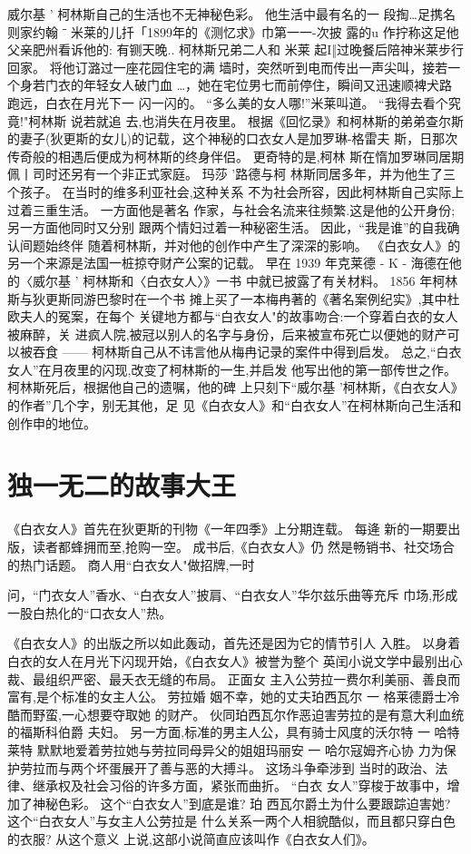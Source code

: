 \documentclass[a4paper]{article}
\begin{document}
威尔基 ' 柯林斯自己的生活也不无神秘色彩。 他生活中最有名的一
段掏…足携名则家约翰 ˉ 米莱的儿扦「1899年的《测忆求》巾第一一-次披
露的u 作拧称这足他父亲肥州看诉他的: 有铡天晚.. 柯林斯兄弟二人和
米莱 起I‖过晚餐后陪神米莱步行回家。 将他订潞过一座花园住宅的满
墙时，突然听到电而传出一声尖叫，接若一个身若门衣的年轻女人破门血
…，她在宅位男七而前停住，瞬间又迅速顺裨犬路跑远，白衣在月光下一
闪一闪的。 “多么美的女人哪!”米莱叫道。 “我得去看个究竟!"柯林斯
说若就追 去,也消失在月夜里。 根据《回忆录》和柯林斯的弟弟查尔斯
的妻子(狄更斯的女儿)的记载，这个神秘的口衣女人是加罗琳-格雷夫
斯，日那次传奇般的相遇后便成为柯林斯的终身伴侣。 更奇特的是,柯林
斯在惰加罗琳同居期佩丨司时还另有一个非正式家庭。 玛莎 '路德与柯
林斯同居多年，并为他生了三个孩子。 在当时的维多利亚社会,这种关系
不为社会所容，因此柯林斯自己实际上过着三重生活。 一方面他是著名
作家，与社会名流来往频繁.这是他的公开身份;另一方面他同时又分别
跟两个情妇过着一种秘密生活。 因此，“我是谁”的自我确认间题始终伴
随着柯林斯，并对他的创作中产生了深深的影响。
《白衣女人》的另一个来源是法国一桩掠夺财产公案的记载。 早在
1939 年克莱德 - K - 海德在他的〈威尔基 ' 柯林斯和〈白衣女人〉》一书
中就已披露了有关材料。 1856 年柯林斯与狄更斯同游巴黎时在一个书
摊上买了一本梅冉著的《著名案例纪实》,其中杜欧夫人的冤案，在每个
关键地方都与“白衣女人"的故事吻合:一个穿着白衣的女人被麻醉，关
进疯人院,被冠以别人的名字与身份，后来被宣布死亡以便她的财产可
以被吞食 ------ 柯林斯自己从不讳言他从梅冉记录的案件中得到启发。
总之,“白衣女人”在月夜里的闪现,改变了柯林斯的一生,并启发
他写出他的第一部传世之作。 柯林斯死后，根据他自己的遗嘱，他的碑
上只刻下“威尔基 '柯林斯，《白衣女人》的作者”几个字，别无其他，足
见《白衣女人》和“白衣女人”在柯林斯向己生活和创作申的地位。

\section{独一无二的故事大王}

《白衣女人》首先在狄更斯的刊物《一年四季》上分期连载。 每逄
新的一期要出版，读者都蜂拥而至,抢购一空。 成书后,《白衣女人》仍
然是畅销书、社交场合的热门话题。 商人用“白衣女人"做招牌,一时

问，“门衣女人”香水、“白衣女人”披肩、“白衣女人”华尔兹乐曲等充斥
巾场,形成一股白热化的“口衣女人”热。

《白衣女人》的出版之所以如此轰动，首先还是因为它的情节引人
入胜。 以身着白衣的女人在月光下闪现开始，《白衣女人》被誉为整个
英闰小说文学中最别出心裁、最组织严密、最夭衣无缝的布局。 正面女
主入公劳拉一费尔利美丽、善良而富有,是个标准的女主人公。 劳拉婚
姻不幸，她的丈夫珀西瓦尔 一 格莱德爵士冷酷而野蛮,一心想要夺取她
的财产。 伙同珀西瓦尔作恶迫害劳拉的是有意大利血统的福斯科伯爵
夫妇。 另一方面,标准的男主人公，具有骑士风度的沃尔特 一 哈特莱特
默默地爱着劳拉她与劳拉同母异父的姐姐玛丽安 一 哈尔寇姆齐心协
力为保护劳拉而与两个坏蛋展开了善与恶的大搏斗。 这场斗争牵涉到
当时的政治、法律、继承权及社会习俗的许多方面，紧张而曲折。 “白衣
女人”穿梭于故事中，增加了神秘色彩。 这个“白衣女人”到底是谁? 珀
西瓦尔爵土为什么要跟踪迫害她? 这个“白衣女人”与女主人公劳拉是
什么关系一两个人相貌酷似，而且都只穿白色的衣服? 从这个意义
上说,这部小说简直应该叫作《白衣女人们》。
\end{document}

